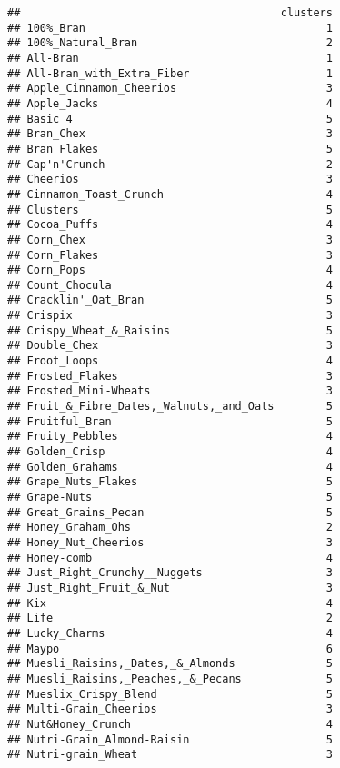 \documentclass[
]{article}
\begin{document}
\begin{verbatim}
##                                        clusters
## 100%_Bran                                     1
## 100%_Natural_Bran                             2
## All-Bran                                      1
## All-Bran_with_Extra_Fiber                     1
## Apple_Cinnamon_Cheerios                       3
## Apple_Jacks                                   4
## Basic_4                                       5
## Bran_Chex                                     3
## Bran_Flakes                                   5
## Cap'n'Crunch                                  2
## Cheerios                                      3
## Cinnamon_Toast_Crunch                         4
## Clusters                                      5
## Cocoa_Puffs                                   4
## Corn_Chex                                     3
## Corn_Flakes                                   3
## Corn_Pops                                     4
## Count_Chocula                                 4
## Cracklin'_Oat_Bran                            5
## Crispix                                       3
## Crispy_Wheat_&_Raisins                        5
## Double_Chex                                   3
## Froot_Loops                                   4
## Frosted_Flakes                                3
## Frosted_Mini-Wheats                           3
## Fruit_&_Fibre_Dates,_Walnuts,_and_Oats        5
## Fruitful_Bran                                 5
## Fruity_Pebbles                                4
## Golden_Crisp                                  4
## Golden_Grahams                                4
## Grape_Nuts_Flakes                             5
## Grape-Nuts                                    5
## Great_Grains_Pecan                            5
## Honey_Graham_Ohs                              2
## Honey_Nut_Cheerios                            3
## Honey-comb                                    4
## Just_Right_Crunchy__Nuggets                   3
## Just_Right_Fruit_&_Nut                        3
## Kix                                           4
## Life                                          2
## Lucky_Charms                                  4
## Maypo                                         6
## Muesli_Raisins,_Dates,_&_Almonds              5
## Muesli_Raisins,_Peaches,_&_Pecans             5
## Mueslix_Crispy_Blend                          5
## Multi-Grain_Cheerios                          3
## Nut&Honey_Crunch                              4
## Nutri-Grain_Almond-Raisin                     5
## Nutri-grain_Wheat                             3

\end{verbatim}
\end{document}
